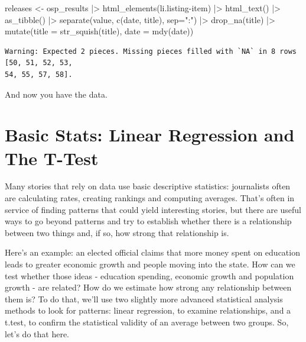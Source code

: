 \documentclass[
  letterpaper,
  DIV=11,
  numbers=noendperiod]{scrreprt}
\newenvironment{Shaded}{\begin{snugshade}}{\end{snugshade}}
\newcommand{\AttributeTok}[1]{\textcolor[rgb]{0.40,0.45,0.13}{#1}}
\newcommand{\FunctionTok}[1]{\textcolor[rgb]{0.28,0.35,0.67}{#1}}
\newcommand{\NormalTok}[1]{\textcolor[rgb]{0.00,0.23,0.31}{#1}}
\newcommand{\OtherTok}[1]{\textcolor[rgb]{0.00,0.23,0.31}{#1}}
\newcommand{\SpecialCharTok}[1]{\textcolor[rgb]{0.37,0.37,0.37}{#1}}
\newcommand{\StringTok}[1]{\textcolor[rgb]{0.13,0.47,0.30}{#1}}
\begin{document}
\begin{Shaded}
\begin{Highlighting}[]
\NormalTok{releases }\OtherTok{\textless{}{-}}\NormalTok{ osp\_results }\SpecialCharTok{|\textgreater{}} \FunctionTok{html\_elements}\NormalTok{(}\StringTok{\textquotesingle{}li.listing{-}item\textquotesingle{}}\NormalTok{) }\SpecialCharTok{|\textgreater{}} \FunctionTok{html\_text}\NormalTok{() }\SpecialCharTok{|\textgreater{}} \FunctionTok{as\_tibble}\NormalTok{() }\SpecialCharTok{|\textgreater{}} \FunctionTok{separate}\NormalTok{(value, }\FunctionTok{c}\NormalTok{(}\StringTok{\textquotesingle{}date\textquotesingle{}}\NormalTok{, }\StringTok{\textquotesingle{}title\textquotesingle{}}\NormalTok{), }\AttributeTok{sep=}\StringTok{":"}\NormalTok{) }\SpecialCharTok{|\textgreater{}} \FunctionTok{drop\_na}\NormalTok{(title) }\SpecialCharTok{|\textgreater{}} \FunctionTok{mutate}\NormalTok{(}\AttributeTok{title =} \FunctionTok{str\_squish}\NormalTok{(title), }\AttributeTok{date =} \FunctionTok{mdy}\NormalTok{(date))}
\end{Highlighting}
\end{Shaded}

\begin{verbatim}
Warning: Expected 2 pieces. Missing pieces filled with `NA` in 8 rows [50, 51, 52, 53,
54, 55, 57, 58].
\end{verbatim}

And now you have the data.


\hypertarget{basic-stats-linear-regression-and-the-t-test}{%
\chapter{Basic Stats: Linear Regression and The
T-Test}\label{basic-stats-linear-regression-and-the-t-test}}

Many stories that rely on data use basic descriptive statistics:
journalists often are calculating rates, creating rankings and computing
averages. That's often in service of finding patterns that could yield
interesting stories, but there are useful ways to go beyond patterns and
try to establish whether there is a relationship between two things and,
if so, how strong that relationship is.

Here's an example: an elected official claims that more money spent on
education leads to greater economic growth and people moving into the
state. How can we test whether those ideas - education spending,
economic growth and population growth - are related? How do we estimate
how strong any relationship between them is? To do that, we'll use two
slightly more advanced statistical analysis methods to look for
patterns: linear regression, to examine relationships, and a t.test, to
confirm the statistical validity of an average between two groups. So,
let's do that here.
\end{document}
